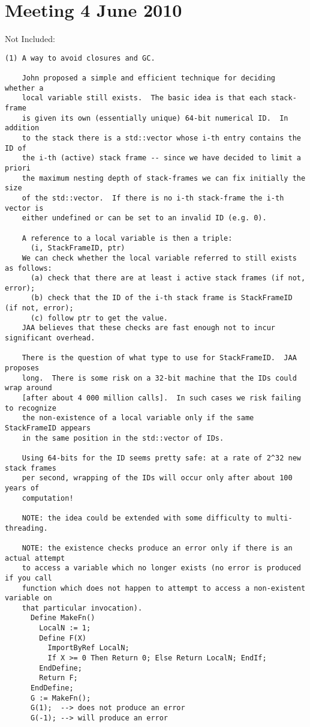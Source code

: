 \documentclass{book}[12,a4paper]
\def\refandpage#1{{\ref{#1}, pg.\pageref{#1}}}
\begin{document}
\section{Meeting 4 June 2010}

Not Included: %
\begin{verbatim}
(1) A way to avoid closures and GC.

    John proposed a simple and efficient technique for deciding whether a
    local variable still exists.  The basic idea is that each stack-frame
    is given its own (essentially unique) 64-bit numerical ID.  In addition
    to the stack there is a std::vector whose i-th entry contains the ID of
    the i-th (active) stack frame -- since we have decided to limit a priori
    the maximum nesting depth of stack-frames we can fix initially the size
    of the std::vector.  If there is no i-th stack-frame the i-th vector is
    either undefined or can be set to an invalid ID (e.g. 0).

    A reference to a local variable is then a triple:
      (i, StackFrameID, ptr)
    We can check whether the local variable referred to still exists as follows:
      (a) check that there are at least i active stack frames (if not, error);
      (b) check that the ID of the i-th stack frame is StackFrameID (if not, error);
      (c) follow ptr to get the value.
    JAA believes that these checks are fast enough not to incur significant overhead.

    There is the question of what type to use for StackFrameID.  JAA proposes
    long.  There is some risk on a 32-bit machine that the IDs could wrap around
    [after about 4 000 million calls].  In such cases we risk failing to recognize
    the non-existence of a local variable only if the same StackFrameID appears
    in the same position in the std::vector of IDs.

    Using 64-bits for the ID seems pretty safe: at a rate of 2^32 new stack frames
    per second, wrapping of the IDs will occur only after about 100 years of
    computation!

    NOTE: the idea could be extended with some difficulty to multi-threading.

    NOTE: the existence checks produce an error only if there is an actual attempt
    to access a variable which no longer exists (no error is produced if you call
    function which does not happen to attempt to access a non-existent variable on
    that particular invocation).
      Define MakeFn()
        LocalN := 1;
        Define F(X)
          ImportByRef LocalN;
          If X >= 0 Then Return 0; Else Return LocalN; EndIf;
        EndDefine;
        Return F;
      EndDefine;
      G := MakeFn();
      G(1);  --> does not produce an error
      G(-1); --> will produce an error



\end{verbatim}
\end{document}
